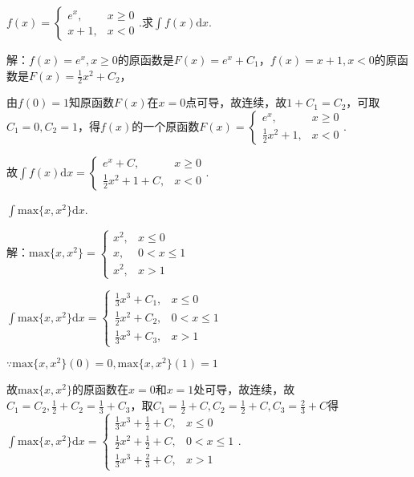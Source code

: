 \documentclass[12pt,UTF8]{ctexart}
\begin{document}
\begin{enumerate}
$f(x)=\begin{cases}
e^x,&x\geq0\\
x+1,&x<0
\end{cases}.$求$\int f(x)\mathrm dx$.

解：$f(x)=e^x,x\geq0$的原函数是$F(x)=e^x+C_1$，$f(x)=x+1,x<0$的原函数是$F(x)=\frac12x^2+C_2$，

由$f(0)=1$知原函数$F(x)$在$x=0$点可导，故连续，故$1+C_1=C_2$，可取$C_1=0,C_2=1$，得$f(x)$的一个原函数$F(x)=\begin{cases}
e^x,&x\geq0\\
\frac12x^2+1,&x<0
\end{cases}.$

故$\int f(x)\mathrm dx=\begin{cases}
e^x+C,&x\geq0\\
\frac12x^2+1+C,&x<0
\end{cases}.$

$\int\text{max}\{x,x^2\}\mathrm dx$.

解：$\text{max}\{x,x^2\}=\begin{cases}
x^2,&x\leq0\\
x,&0<x\leq1\\
x^2,&x>1
\end{cases}$

$\int\text{max}\{x,x^2\}\mathrm dx=\begin{cases}
\frac13x^3+C_1,&x\leq0\\
\frac12x^2+C_2,&0<x\leq1\\
\frac13x^3+C_3,&x>1
\end{cases}$

$\because\text{max}\{x,x^2\}(0)=0,\text{max}\{x,x^2\}(1)=1$

故$\text{max}\{x,x^2\}$的原函数在$x=0$和$x=1$处可导，故连续，故$C_1=C_2,\frac12+C_2=\frac13+C_3$，取$C_1=\frac12+C,C_2=\frac12+C,C_3=\frac23+C$得$\int\text{max}\{x,x^2\}\mathrm dx=\begin{cases}
\frac13x^3+\frac12+C,&x\leq0\\
\frac12x^2+\frac12+C,&0<x\leq1\\
\frac13x^3+\frac23+C,&x>1
\end{cases}.$
\end{enumerate}
\end{document}
